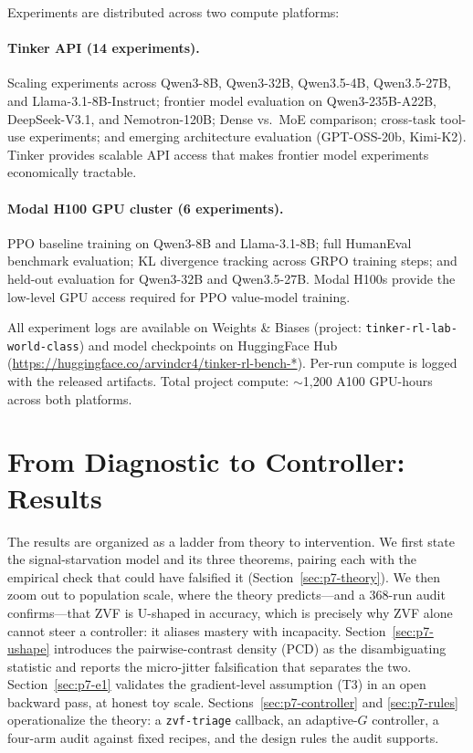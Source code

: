 \documentclass{article}
\begin{document}
Experiments are distributed across two compute platforms:

\paragraph{Tinker API (14 experiments).}
Scaling experiments across Qwen3-8B, Qwen3-32B, Qwen3.5-4B, Qwen3.5-27B,
and Llama-3.1-8B-Instruct; frontier model evaluation on Qwen3-235B-A22B,
DeepSeek-V3.1, and Nemotron-120B; Dense vs.~MoE comparison; cross-task
tool-use experiments; and emerging architecture evaluation (GPT-OSS-20b,
Kimi-K2). Tinker provides scalable API access that makes frontier model
experiments economically tractable.

\paragraph{Modal H100 GPU cluster (6 experiments).}
PPO baseline training on Qwen3-8B and Llama-3.1-8B; full HumanEval
benchmark evaluation; KL divergence tracking across GRPO training steps;
and held-out evaluation for Qwen3-32B and Qwen3.5-27B. Modal H100s
provide the low-level GPU access required for PPO value-model training.

All experiment logs are available on Weights \& Biases (project:
\texttt{tinker-rl-lab-world-class}) and model checkpoints on HuggingFace
Hub (\url{https://huggingface.co/arvindcr4/tinker-rl-bench-*}).
Per-run compute is logged with the released artifacts. Total project compute:
$\sim$1,200 A100 GPU-hours across both platforms.

 \section{From Diagnostic to Controller: Results}
\label{sec:p7-results}
The results are organized as a ladder from theory to intervention. We first
state the signal-starvation model and its three theorems, pairing each with
the empirical check that could have falsified it
(Section~\ref{sec:p7-theory}). We then zoom out to population scale, where
the theory predicts---and a 368-run audit confirms---that ZVF is U-shaped in
accuracy, which is precisely why ZVF alone cannot steer a controller: it
aliases mastery with incapacity. Section~\ref{sec:p7-ushape} introduces the
pairwise-contrast density (PCD) as the disambiguating statistic and reports
the micro-jitter falsification that separates the two. Section~\ref{sec:p7-e1}
validates the gradient-level assumption (T3) in an open backward pass, at
honest toy scale. Sections~\ref{sec:p7-controller} and \ref{sec:p7-rules}
operationalize the theory: a \texttt{zvf-triage} callback, an adaptive-$G$
controller, a four-arm audit against fixed recipes, and the design rules the
audit supports.
\end{document}
